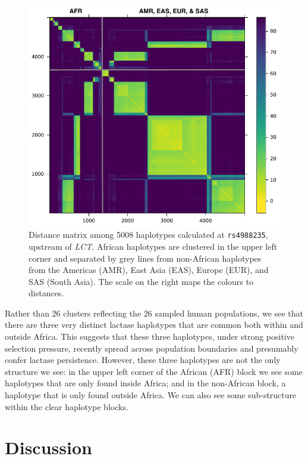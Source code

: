 \documentclass[pdflatex,referee,lineno,sn-nature]{sn-jnl}%
\begin{document}
\begin{figure}
  \centering
  \includegraphics{fig5}
	\caption{
	  Distance matrix among 5008 haplotypes calculated at \texttt{rs4988235}, upstream of \emph{LCT}.
	  African haplotypes are clustered in the upper left corner and separated by grey lines from non-African haplotypes from the Americas (AMR), East Asia (EAS), Europe (EUR), and SAS (South Asia).
	  The scale on the right maps the colours to distances.
	}
	\label{fig:lct}
\end{figure}

Rather than 26 clusters reflecting the 26 sampled human populations, we see that there are three very distinct lactase haplotypes that are common both within and outside Africa.
This suggests that these three haplotypes, under strong positive selection pressure, recently spread across population boundaries and presumably confer lactase persistence.
However, these three haplotypes are not the only structure we see: in the upper left corner of the African (AFR) block we see some haplotypes that are only found inside Africa; and in the non-African block, a haplotype that is only found outside Africa.
We can also see some sub-structure within the clear haplotype blocks.



\section*{Discussion}
\label{sec:thepkg}
\end{document}
